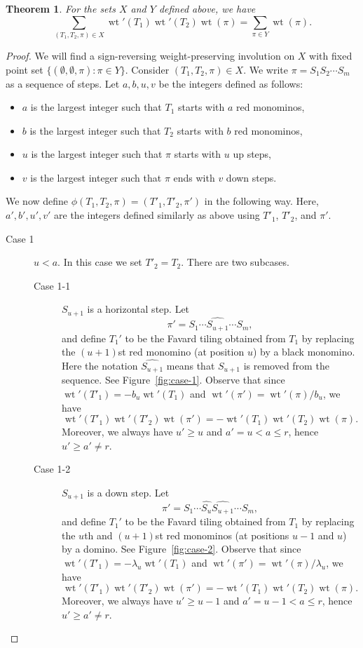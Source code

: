 \documentclass[oneside]{book}
\numberwithin{equation}{section}
\newtheorem{thm}{Theorem}[section]
\theoremstyle{definition}
\newcommand\wt{\operatorname{wt}}
\begin{document}
\begin{thm}\label{thm:5}
  For the sets \( X \) and \( Y \) defined above, we have
\begin{equation}\label{eq:LL(xPP)2}
  \sum_{(T_1,T_2,\pi)\in X} \wt'(T_1) \wt'(T_2) \wt(\pi)
  =  \sum_{\pi\in Y} \wt(\pi).
\end{equation}
\end{thm}

\begin{proof}
  We will find a sign-reversing weight-preserving involution on
  \( X \) with fixed point set
  \( \{ (\emptyset,\emptyset,\pi):\pi\in Y\} \). Consider
  \( (T_1,T_2,\pi)\in X \). We write \( \pi=S_1S_2 \cdots S_{m} \) as
  a sequence of steps. Let \( a,b,u,v \) be the integers defined as follows:
 \begin{itemize}
 \item \( a \) is the largest integer such that \( T_1 \)
   starts with \( a \) red monominos,
 \item \( b \) is the largest integer such that \( T_2 \)
   starts with \( b \) red monominos,
 \item \( u \) is the largest integer such that \( \pi \) starts with
   \( u \) up steps,
 \item \( v \) is the largest integer such that \( \pi \) ends with
   \( v \) down steps.
 \end{itemize}

 We now define \( \phi(T_1,T_2,\pi)= (T'_1,T'_2,\pi') \) in the following
 way. Here, \( a',b',u',v' \) are the integers defined similarly as
 above using \( T'_1 \), \( T'_2 \), and \( \pi' \).
\begin{description}
\item[Case 1] \( u<a \). In this case we set \( T'_2 = T_2 \). There are two
  subcases.
\begin{description}
\item[Case 1-1] \( S_{u+1} \) is a horizontal step. Let
    \[
      \pi' = S_1\cdots \widehat{S_{u+1}} \cdots S_{m},
\]
and define $T_1'$ to be the Favard tiling obtained from $T_1$ by
replacing the \( (u+1) \)st red monomino (at position \( u \)) by a
black monomino. Here the notation $\widehat{S_{u+1}}$ means that
$S_{u+1}$ is removed from the sequence. See Figure~\ref{fig:case-1}.
Observe that since \( \wt'(T'_1) = -b_u \wt'(T_1) \) and
\( \wt'(\pi') = \wt'(\pi)/ b_u \), we have
\[ \wt'(T'_1)\wt'(T'_2)\wt(\pi') = - \wt'(T_1)\wt'(T_2)\wt(\pi). \]
Moreover, we always have \( u'\ge u \) and \( a'=u<a\le r \), hence
\( u'\ge a'\ne r \).
\item[Case 1-2] $S_{u+1}$ is a down step. Let
    \[
      \pi' = S_1\cdots \widehat{S_{u}}\widehat{S_{u+1}} \cdots S_m,
\]
and define $T_1'$ to be the Favard tiling obtained from $T_1$ by
replacing the \( u \)th and \( (u+1) \)st red monominos (at positions
$u-1$ and $u$) by a domino. See Figure~\ref{fig:case-2}. 
Observe that since \( \wt'(T'_1) = -\lambda_u \wt'(T_1) \) and
\( \wt'(\pi') = \wt'(\pi)/ \lambda_u \), we have
\[ \wt'(T'_1)\wt'(T'_2)\wt(\pi') = - \wt'(T_1)\wt'(T_2)\wt(\pi). \]
Moreover, we always have \( u'\ge u-1 \) and \( a'=u-1<a\le r \),
hence \( u'\ge a'\ne r \).
\end{description}


\end{description}
\end{proof}
\end{document}
